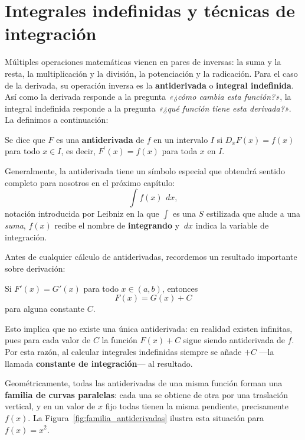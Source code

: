 \chapter{Integrales indefinidas y técnicas de integración}
\label{cap:tecintegracion}

Múltiples operaciones matemáticas vienen en pares de inversas: la suma y la
resta, la multiplicación y la división, la potenciación y la radicación. Para
el caso de la derivada, su operación inversa es la \textbf{antiderivada} o
\textbf{integral indefinida}. Así como la derivada responde a la pregunta
\emph{«¿cómo cambia esta función?»}, la integral indefinida responde a la
pregunta \emph{«¿qué función tiene esta derivada?»}. La definimos a
continuación:

\begin{definition}
Se dice que $F$ es una \textbf{antiderivada} de $f$ en un intervalo $I$ si
$D_{x}F(x)=f(x)$ para todo $x\in I$, es decir, $F^{\prime}(x)=f(x)$ para
toda $x$ en $I$.
\end{definition}

Generalmente, la antiderivada tiene un símbolo especial que obtendrá sentido
completo para nosotros en el próximo capítulo:
\[
  \int f(x)\,\ dx,
\]
notación introducida por Leibniz en la que $\int$ es una $S$ estilizada que
alude a una \emph{suma}, $f(x)$ recibe el nombre de \textbf{integrando} y
$\ dx$ indica la variable de integración.

Antes de cualquier cálculo de antiderivadas, recordemos un resultado
importante sobre derivación:

\begin{coro}
Si $F'(x)=G'(x)$ para todo $x\in(a,b)$, entonces
\[
  F(x)=G(x)+C
\]
para alguna constante $C$.
\end{coro}

Esto implica que no existe una única antiderivada: en realidad existen
infinitas, pues para cada valor de $C$ la función $F(x)+C$ sigue siendo
antiderivada de $f$. Por esta razón, al calcular integrales indefinidas
siempre se añade $+C$ —la llamada \textbf{constante de integración}— al
resultado.

Geométricamente, todas las antiderivadas de una misma función forman una
\textbf{familia de curvas paralelas}: cada una se obtiene de otra por una
traslación vertical, y en un valor de $x$ fijo todas tienen la misma
pendiente, precisamente $f(x)$. La Figura~\ref{fig:familia_antiderivadas}
ilustra esta situación para $f(x)=x^2$.

